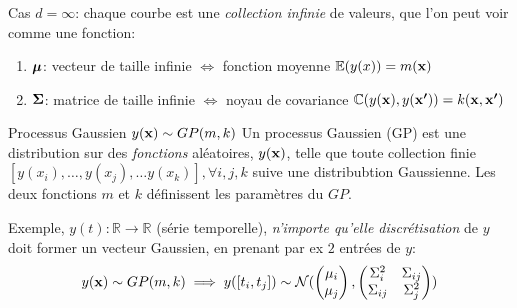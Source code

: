 \documentclass[xcolor=svgnames, t]{beamer}
\newcommand{\coloredemph}[1]{\textcolor{internationalblue}{\emph{#1}}}
\newcommand{\vectorx}[1]{\boldsymbol{\MakeLowercase{\mathbf{#1}}}}
\newcommand{\matrixx}[1]{\boldsymbol{\MakeUppercase{#1}}}
\begin{document}
\begin{frame}
  \frametitle{\secname}
  Cas $d=\infty$: chaque courbe est une \coloredemph{collection infinie} de valeurs, que l'on peut voir comme une fonction:
  \begin{enumerate}
    \item $\vectorx{\mu}$: vecteur de taille infinie $\Leftrightarrow$ fonction moyenne $\mathbb{E}(y(x)) = m(\vectorx{x})$
    \item $\matrixx{\Sigma}$: matrice de taille infinie $\Leftrightarrow$  noyau de covariance 
    $\mathbb{C}( y(\vectorx{x}), y(\vectorx{x^\prime}) ) = k(\vectorx{x}, \vectorx{x^{\prime}})$
  \end{enumerate}
  \pause
  \begin{block}{Processus Gaussien $y(\vectorx{x}) \sim GP(m, k)$}
    Un processus Gaussien (GP) est une distribution sur des \coloredemph{fonctions} aléatoires,
   $y(\vectorx{x})$, telle que toute collection finie
    $[ y(x_i), \dots, y(x_j), \dots y(x_k) ], \forall i,j,k$ suive une distribubtion Gaussienne. 
    Les deux fonctions $m$ et $k$ définissent les paramètres du $GP$.
  \end{block}
  \pause
  Exemple, $y(t): \mathbb{R} \to \mathbb{R}$ (série temporelle), \coloredemph{n'importe qu'elle discrétisation} de $y$ doit
   former un vecteur Gaussien, en prenant par ex $2$ entrées de $y$:
  \begin{equation*}
    y(\vectorx{x}) \sim GP(m, k) \implies
    y([t_i, t_j]) \sim \mathcal{N} (
      \begin{pmatrix}
        \mu_i \\
        \mu_j 
      \end{pmatrix},
      \begin{pmatrix}
        \Sigma_{i}^2 & \Sigma_{ij} \\
        \Sigma_{ij} & \Sigma_{j}^2
      \end{pmatrix}
      )
  \end{equation*}
\end{frame}
\end{document}
